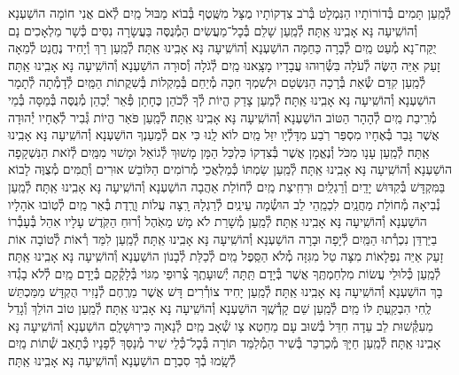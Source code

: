 \documentclass[twoside, openany, parskip=half, 11pt]{book}
\begin{document}
\begin{small}
לְ֯מַֽעַן תָּמִים בְּ֯דוֹרוֹתָיו הַנִּמְלָט בְּ֯רֹב צִדְקוֹתָיו
מֻצָּל מִשֶּֽׁטֶף בְּ֯בוֹא מַבּוּל מַֽיִם לְ֯אֹם אֲנִי חוֹמָה הוֹשַׁעְנָא וְ֯הוֹשִֽׁיעָה נָּא אָבִֽינוּ אַֽתָּה׃
לְ֯מַֽעַן שָׁלֵם בְּ֯כׇל־מַעֲשִׂים הַמְ֯נֻסֶּה בַּעֲשָׂרָה נִסִּים
כְּ֯שָׁר מַלְאָכִים נָם יֻקַּח־נָא מְ֯עַט מַֽיִם לְ֯בָרָה כַּחַמָּה הוֹשַׁעְנָא וְ֯הוֹשִֽׁיעָה נָּא אָבִֽינוּ אַֽתָּה׃
לְ֯מַֽעַן רַךְ וְ֯יָחִיד נֶחֱנַט לְ֯מֵאָה זָעַק אַיֵּה הַשֶּׂה לְ֯עֹלָה
בִּשְּׂ֯רֽוּהוּ עֲבָדָיו מָצָֽאנוּ מַֽיִם לְ֯גֹלָה וְ֯סוּרָה הוֹשַׁעְנָא וְ֯הוֹשִֽׁיעָה נָּא אָבִֽינוּ אַֽתָּה׃
לְ֯מַֽעַן קִדַּם שְׂ֯אֵת בְּ֯רָכָה הַנִּשְׂטַם וּלְשִׁמְךָ חִכָּה
מְ֯יַחֵם בְּ֯מַקְלוֹת בְּ֯שִׁקֲתוֹת הַמַּֽיִם לְ֯דָמְ֯תָה לְ֯תָמָר הוֹשַׁעְנָא וְ֯הוֹשִֽׁיעָה נָּא אָבִֽינוּ אַֽתָּה׃
לְ֯מַעַן צָדַק הֱיוֹת לְ֯ךָ לְ֯כֹהֵן כֶּחָתָן פְּ֯אֵר יְ֯כַהֵן
מְ֯נֻסֶּה בְּ֯מַסָּה בְּ֯מֵי מְ֯רִֽיבַת מַֽיִם לְ֯הָהָר הַטּוֹב הוֹשַׁעְנָא וְ֯הוֹשִֽׁיעָה נָּא אָבִֽינוּ אַֽתָּה׃
לְ֯מַֽעַן פֹּאַר הֱיוֹת גְּ֯בִיר לְ֯אֶחָיו יְ֯הוּדָה אֲשֶׁר גָּבַר בְּ֯אֶחָיו
מִסְפַּר רֹֽבַע מִדָּלְ֯יָו יִזַּל מַֽיִם לוֹא לָֽנוּ כִּי אִם לְ֯מַעַנְךָ הוֹשַׁעְנָא וְ֯הוֹשִֽׁיעָה נָּא אָבִֽינוּ אַֽתָּה׃
לְ֯מַֽעַן עָנָו מִכֹּל וְ֯נֶאֱמָן אֲשֶׁר בְּ֯צִדְקוֹ כִּלְכֵּל הַמָּן
מָשׁוּךְ לְ֯גוֹאֵל וּמָשׁוּי מִמַּֽיִם לְ֯זֹאת הַנִּשְׁקָפָה הוֹשַׁעְנָא וְ֯הוֹשִֽׁיעָה נָּא אָבִֽינוּ אַֽתָּה׃
לְ֯מַֽעַן שַׂמְתּוֹ כְּ֯מַלְאֲכֵי מְ֯רוֹמִים הַלּוֹבֵשׁ אוּרִים וְ֯תֻמִּים
מְ֯צֻוֶּה לָבוֹא בַּמִּקְדָּשׁ בְּ֯קִדּוּשׁ יָדַֽיִם וְ֯רַגְלַֽיִם וּרְחִֽיצַת מַֽיִם
לְ֯חוֹלַת אַהֲבָה הוֹשַׁעְנָא וְ֯הוֹשִֽׁיעָה נָּא אָבִֽינוּ אַֽתָּה׃
לְ֯מַֽעַן נְ֯בִיאָה מְ֯חוֹלַת מַחֲנַֽיִם לִכְמֵֽהֵי לֵב הוּשְׂ֯מָה עֵינַֽיִם
לְ֯רַגְלָהּ רָֽצָה עֲלוֹת וָרֶֽדֶת בְּ֯אֵר מַֽיִם לְ֯טֽוֹבוּ אֹהָלָיו הוֹשַׁעְנָא וְ֯הוֹשִֽׁיעָה נָּא אָבִֽינוּ אַֽתָּה׃
לְ֯מַֽעַן מְ֯שָׁרֵת לֹא מָשׁ מֵאֹֽהֶל וְ֯רוּחַ הַקֹּֽדֶשׁ עָלָיו אִהֵל
בְּ֯עָבְ֯רוֹ בַיַּרְדֵּן נִכְרְ֯תוּ הַמַּֽיִם לְ֯יָפָה וּבָרָה הוֹשַׁעְנָא וְ֯הוֹשִֽׁיעָה נָּא אָבִֽינוּ אַֽתָּה׃
לְ֯מַֽעַן לִמַּד רְ֯אוֹת לְ֯טוֹבָה אוֹת זָעַק אַיֵּה נִפְלָאוֹת
מִצָּה טַל מִגִּזָּה מְ֯לֹא הַסֵּֽפֶל מַֽיִם לְ֯כַלַּת לְ֯בָנוֹן הוֹשַׁעְנָא וְ֯הוֹשִֽׁיעָה נָּא אָבִֽינוּ אַֽתָּה׃
לְ֯מַֽעַן כְּ֯לוּלֵי עֲשׂוֹת מִלְחַמְתֶּֽךָ אֲשֶׁר בְּ֯יָדָם תַּֽתָּה יְ֯שׁוּעָתֶֽךָ
צְ֯רוּפֵי מִגּוֹי בְּ֯לָקְ֯קָם בְּ֯יָדָם מַֽיִם לְ֯לֹא בָגְ֯דוּ בָךְ הוֹשַׁעְנָא וְ֯הוֹשִֽׁיעָה נָּא אָבִֽינוּ אַֽתָּה׃
לְ֯מַֽעַן יָחִיד צוֹרְ֯רִים דָּשׁ אֲשֶׁר מֵרֶֽחֶם לְ֯נָזִיר הֻקְדָּשׁ
מִמַּכְתֵּשׁ לֶֽחִי הִבְקַֽעְתָּ לּוֹ מַֽיִם לְ֯מַֽעַן שֵׁם קָדְ֯שֶֽׁךָ הוֹשַׁעְנָא וְ֯הוֹשִֽׁיעָה נָּא אָבִֽינוּ אַֽתָּה׃
לְ֯מַֽעַן טוֹב הוֹלֵךְ וְ֯גָדֵל מֵעִקְּ֯שׁוּת לֵב עֵדָה חִדֵּל
בְּ֯שׁוּב עָם מֵחֵטְא צָו שְׁ֯אָב מַֽיִם לְ֯נָאוָה כִּירֽוּשָׁלָֽםִ הוֹשַׁעְנָא וְ֯הוֹשִֽׁיעָה נָּא אָבִֽינוּ אַֽתָּה׃
לְ֯מַֽעַן חַיָּךְ מְ֯כַרְכֵּר בְּ֯שִׁיר הַמְ֯לַמֵּד תּוֹרָה בְּ֯כׇל־כְּ֯לֵי שִׁיר
מְ֯נַסֵּךְ לְ֯פָנָיו כְּ֯תָאַב שְׁ֯תוֹת מַֽיִם לְ֯שָֽׂמוּ בְ֯ךָ סִבְרָם הוֹשַׁעְנָא וְ֯הוֹשִֽׁיעָה נָּא אָבִֽינוּ אַֽתָּה׃

\end{small}
\end{document}
